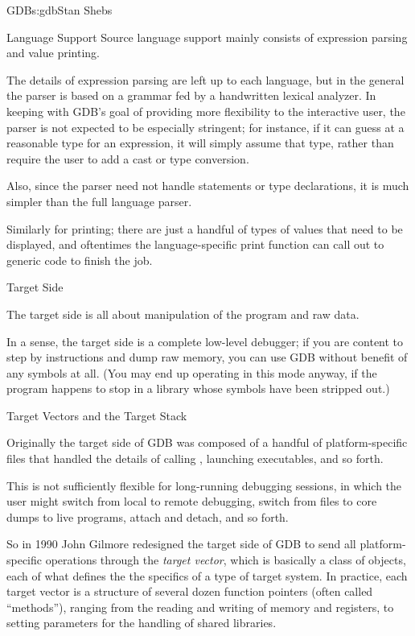 \begin{aosachapter}{GDB}{s:gdb}{Stan Shebs}
\begin{aosasect2}{Language Support}
Source language support mainly consists of expression parsing and value
printing.

The details of expression parsing are left up to each language, but in
the general the parser is based on a  grammar fed by a handwritten
lexical analyzer.  In keeping with GDB's goal of providing more
flexibility to the interactive user, the parser is not expected to be
especially stringent; for instance, if it can guess at a reasonable
type for an expression, it will simply assume that type, rather than
require the user to add a cast or type conversion.

Also, since the parser need not handle statements or type
declarations, it is much simpler than the full language parser.

Similarly for printing; there are just a handful of types of values
that need to be displayed, and oftentimes the language-specific print
function can call out to generic code to finish the job.

\end{aosasect2}

\begin{aosasect1}{Target Side}

The target side is all about manipulation of the program and raw data.

In a sense, the target side is a complete low-level debugger; if you
are content to step by instructions and dump raw memory, you can use
GDB without benefit of any symbols at all.  (You may end up operating
in this mode anyway, if the program happens to stop in a library whose
symbols have been stripped out.)

\begin{aosasect2}{Target Vectors and the Target Stack}

Originally the target side of GDB was composed of a handful of
platform-specific files that handled the details of calling
, launching executables, and so forth.

This is not sufficiently flexible for long-running debugging sessions,
in which the user might switch from local to remote debugging, switch
from files to core dumps to live programs, attach and detach, and so
forth.

So in 1990 John Gilmore redesigned the target side of GDB to send all
platform-specific operations through the {\em target vector}, which is
basically a class of objects, each of what defines the the specifics
of a type of target system.  In practice, each target vector is a
structure of several dozen function pointers (often called
``methods''), ranging from the reading and writing of memory and
registers, to setting parameters for the handling of shared libraries.


\end{aosasect2}
\end{aosasect1}
\end{aosachapter}
